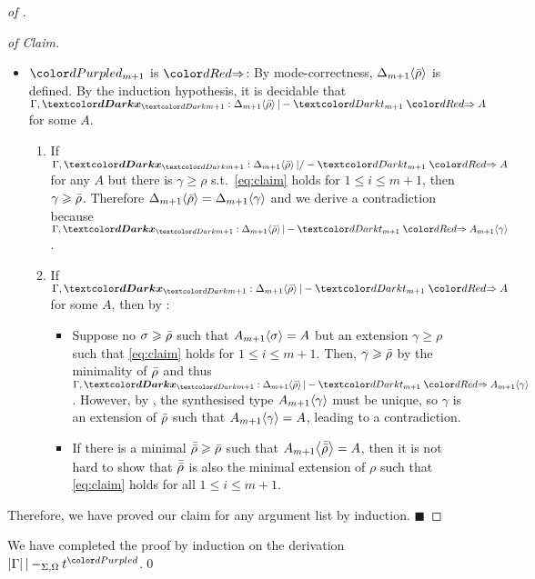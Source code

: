 \begin{proof}[of {}]
\begin{proof}[of Claim]
\begin{enumerate}
\begin{enumerate}
\begin{itemize}
                  \item $\dir{d_{m+1}}$ is $\syn$: By mode-correctness, ${\Delta_{m+1}}\!\left<{\bar{\rho}}\right>$ is defined.
                    By the induction hypothesis, it is decidable that $\Gamma, \vars{x}_\isTerm{m+1} : \simsub{\Delta_{m+1}}{\ext{\rho}} |- \isTerm{t_{m+1}} \syn A$ for some $A$.
                    \begin{enumerate}
                      \item If $\Gamma, \vars{x}_\isTerm{m+1} : \simsub{\Delta_{m+1}}{\ext{\rho}} |/- \isTerm{t_{m+1}} \syn A$ for any $A$ but there is $\gamma \geq \rho$ s.t.\ \eqref{eq:claim} holds for $1 \leq i \leq m+1$, then $\gamma \geqslant \bar{\rho}$.
                        Therefore ${\Delta_{m+1}}\!\left<{\bar{\rho}}\right> = {\Delta_{m+1}}\!\left<{\gamma}\right>$ and we derive a contradiction because $\Gamma, \vars{x}_\isTerm{m+1} : \simsub{\Delta_{m+1}}{\ext{\rho}} |- \isTerm{t_{m+1}} \syn \simsub{A_{m+1}}{\gamma}$.
                      \item If $\Gamma, \vars{x}_\isTerm{m+1} : \simsub{\Delta_{m+1}}{\ext{\rho}} |- \isTerm{t_{m+1}} \syn A$ for some $A$, then by : %
                        \begin{itemize}
                          \item Suppose no $\sigma \geqslant \bar{\rho}$ such that ${A_{m+1}}\!\left<{\sigma}\right> = A$ but an extension $\gamma \geq \rho$ such that \eqref{eq:claim} holds for $1 \leq i \leq m + 1$. 
                            Then, $\gamma \geqslant \bar{\rho}$ by the minimality of $\bar{\rho}$ and thus
                            $\Gamma, \vars{x}_\isTerm{m+1} : \simsub{\Delta_{m+1}}{\ext{\rho}} |- \isTerm{t_{m+1}} \syn \simsub{A_{m+1}}{\gamma}$.
                            However, by , the synthesised type ${A_{m+1}}\!\left<{\gamma}\right>$ must be unique, so $\gamma$ is an extension of $\bar{\rho}$ such that ${A_{m+1}}\!\left<{\gamma}\right> = A$, leading to a contradiction.
                          \item If there is a minimal $\bar{\bar{\rho}} \geqslant \bar{\rho}$ such that ${A_{m+1}}\!\left<{\bar{\bar{\rho}}}\right> = A$, then it is not hard to show that $\bar{\bar{\rho}}$ is also the minimal extension of $\rho$ such that \eqref{eq:claim} holds for all $1 \leq i \leq m + 1$.
                        \end{itemize}
                    \end{enumerate}
                \end{itemize}
            \end{enumerate}
        \end{enumerate}
        Therefore, we have proved our claim for any argument list by induction.\hfill
        $\blacksquare$
      \end{proof}
  We have completed the proof by induction on the derivation $\erase{\Gamma} |-_{\Sigma, \Omega} t^{\dir{d}}$.\qed
\end{proof}

